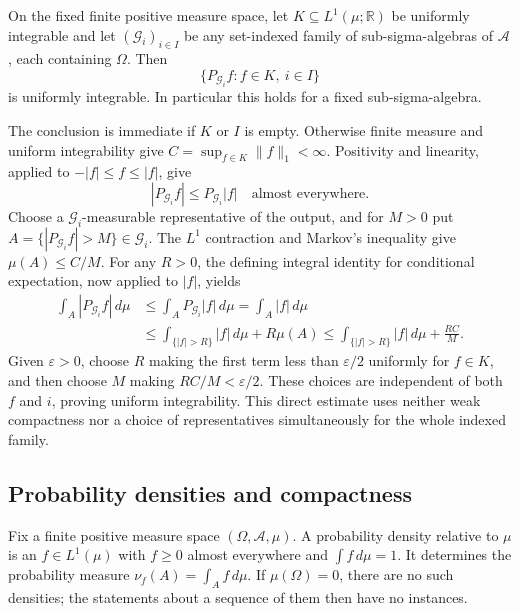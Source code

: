 \begin{corollary}
\label{cor:conditional_expectation_uniform_UI}
On the fixed finite positive measure space, let
$K\subseteq L^1(\mu;\mathbb R)$ be uniformly integrable and let
$(\mathcal G_i)_{i\in I}$ be any set-indexed family of
sub-sigma-algebras of $\mathcal A$, each containing $\Omega$.
Then
\[
\{P_{\mathcal G_i}f:f\in K,\ i\in I\}
\]
is uniformly integrable. In particular this holds for a fixed
sub-sigma-algebra.
\end{corollary}
\Proof
The conclusion is immediate if $K$ or $I$ is empty. Otherwise finite
measure and uniform integrability give $C=\sup_{f\in K}\|f\|_1<\infty$.
Positivity and linearity, applied to $-|f|\leq f\leq|f|$, give
\[
|P_{\mathcal G_i}f|\leq P_{\mathcal G_i}|f|
\quad\text{almost everywhere}.
\]
Choose a $\mathcal G_i$-measurable representative of the output, and
for $M>0$ put $A=\{|P_{\mathcal G_i}f|>M\}\in\mathcal G_i$.
The $L^1$ contraction and Markov's inequality give $\mu(A)\leq C/M$.
For any $R>0$, the defining integral identity for conditional
expectation, now applied to $|f|$, yields
\[
\begin{split}
\int_A|P_{\mathcal G_i}f|\,d\mu
&\leq\int_A P_{\mathcal G_i}|f|\,d\mu
 =\int_A|f|\,d\mu\\
&\leq\int_{\{|f|>R\}}|f|\,d\mu+R\mu(A)
 \leq\int_{\{|f|>R\}}|f|\,d\mu+\frac{RC}{M}.
\end{split}
\]
Given $\varepsilon>0$, choose $R$ making the first term less than
$\varepsilon/2$ uniformly for $f\in K$, and then choose $M$ making
$RC/M<\varepsilon/2$. These choices are independent of both $f$
and $i$, proving uniform integrability. This direct estimate uses
neither weak compactness nor a choice of representatives simultaneously
for the whole indexed family.
\Done

\subsection{Probability densities and compactness}
Fix a finite positive measure space $(\Omega,\mathcal A,\mu)$.
A probability density relative to $\mu$ is an $f\in L^1(\mu)$ with
$f\geq0$ almost everywhere and $\int f\,d\mu=1$. It determines the
probability measure $\nu_f(A)=\int_A f\,d\mu$. If $\mu(\Omega)=0$,
there are no such densities; the statements about a sequence of them
then have no instances.

